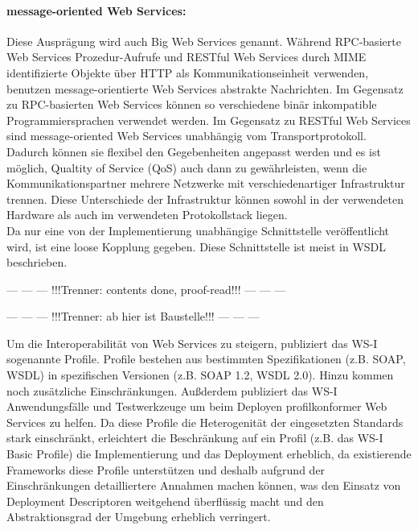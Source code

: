 \documentclass[runningheads]{llncs}
\newcommand{\germanquote}[1]{\glqq{}#1\grqq{}}
\begin{document}
    \paragraph{message-oriented Web Services:}
      Diese Ausprägung wird auch \germanquote{Big Web Services} genannt. Während RPC-basierte Web
      Services Prozedur-Aufrufe und RESTful Web Services durch MIME identifizierte Objekte über
      HTTP als Kommunikationseinheit verwenden, benutzen message-orientierte Web Services abstrakte
      Nachrichten. Im Gegensatz zu RPC-basierten Web Services können so verschiedene binär
      inkompatible Programmiersprachen verwendet werden. Im Gegensatz zu RESTful Web Services sind
      message-oriented Web Services unabhängig vom Transportprotokoll. Dadurch können sie flexibel
      den Gegebenheiten angepasst werden und es ist möglich, \germanquote{Qualtity of Service}
      (QoS) auch dann zu gewährleisten, wenn die Kommunikationspartner mehrere Netzwerke mit
      verschiedenartiger Infrastruktur trennen. Diese Unterschiede der Infrastruktur können sowohl
      in der verwendeten Hardware als auch im verwendeten Protokollstack liegen.\\
      Da nur eine von der Implementierung unabhängige Schnittstelle veröffentlicht wird, ist eine
      loose Kopplung gegeben. Diese Schnittstelle ist meist in WSDL beschrieben.

   \begin{center}--- --- --- !!!Trenner: contents done, proof-read!!! --- --- ---\end{center}

   \begin{center}--- --- --- !!!Trenner: ab hier ist Baustelle!!! --- --- ---\end{center}

    Um die Interoperabilität von Web Services zu steigern, publiziert das WS-I\cite{wsi_hp} sogenannte Profile. Profile bestehen aus bestimmten Spezifikationen (z.B. SOAP, WSDL) in spezifischen Versionen (z.B. SOAP 1.2, WSDL 2.0). Hinzu kommen noch zusätzliche Einschränkungen. Außderdem publiziert das WS-I Anwendungsfälle und Testwerkzeuge um beim Deployen profilkonformer Web Services zu helfen. Da diese Profile die Heterogenität der eingesetzten Standards stark einschränkt, erleichtert die Beschränkung auf ein Profil (z.B. das \germanquote{WS-I Basic Profile}) die Implementierung und das Deployment erheblich, da existierende Frameworks diese Profile unterstützen und deshalb aufgrund der Einschränkungen detailliertere Annahmen machen können, was den Einsatz von Deployment Descriptoren weitgehend überflüssig macht und den Abstraktionsgrad der Umgebung erheblich verringert.
\end{document}
